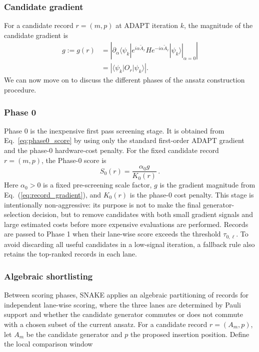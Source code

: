 \documentclass[
  reprint,
  amsmath,
  amssymb,
  aps,
  pra,
  nofootinbib,
  superscriptaddress,
  floatfix
]{revtex4-2}
\begin{document}
\subsubsection{Candidate gradient}
%
\noindent
For a candidate record \(r=(m,p)\) at ADAPT iteration \(k\), the magnitude of the candidate gradient is
\begin{equation}
\begin{aligned}
g:=g(r)
&=
\left|
\left.
\partial_\alpha
\langle\psi_k|
e^{i\alpha\widetilde A_r}
H
e^{-i\alpha\widetilde A_r}
|\psi_k\rangle
\right|_{\alpha=0}
\right|\\
&=
\left|\langle\psi_k|O_r|\psi_k\rangle\right| .
\end{aligned}
\label{eq:record_gradient}
\end{equation}
%
We can now move on to discuss the different phases of the ansatz construction procedure.

\subsubsection{Phase 0}
%
\noindent
Phase 0 is the inexpensive first pass screening stage. It is obtained from Eq.~\eqref{eq:phase0_score} by using only the standard first-order ADAPT gradient and the phase-0 hardware-cost penalty. For the fixed candidate record \(r=(m,p)\), the Phase-0 score is
%
\begin{equation}
S_{0}(r)=\frac{\alpha_0 g}{K_0(r)}\,.
\label{eq:phase0_score}
\end{equation}
%
Here \(\alpha_0>0\) is a fixed pre-screening scale factor, \(g\) is the gradient magnitude from Eq.~(\ref{eq:record_gradient}), and \(K_0(r)\) is the phase-0 cost penalty. This stage is intentionally non-aggressive: its purpose is not to make the final generator-selection decision, but to remove candidates with both small gradient signals and large estimated costs before more expensive evaluations are performed. Records are passed to Phase 1 when their lane-wise score exceeds the threshold \(\tau_{0,\ell}\). To avoid discarding all useful candidates in a low-signal iteration, a fallback rule also retains the top-ranked records in each lane.

\subsubsection{Algebraic shortlisting}
%
Between scoring phases, SNAKE applies an algebraic partitioning of records for independent lane-wise scoring, where the three lanes are determined by Pauli support and whether the candidate generator commutes or does not commute with a chosen subset of the current ansatz. For a candidate record \(r=(A_m,p)\), let \(A_m\) be the candidate generator and \(p\) the proposed insertion position. Define the local comparison window
\end{document}
